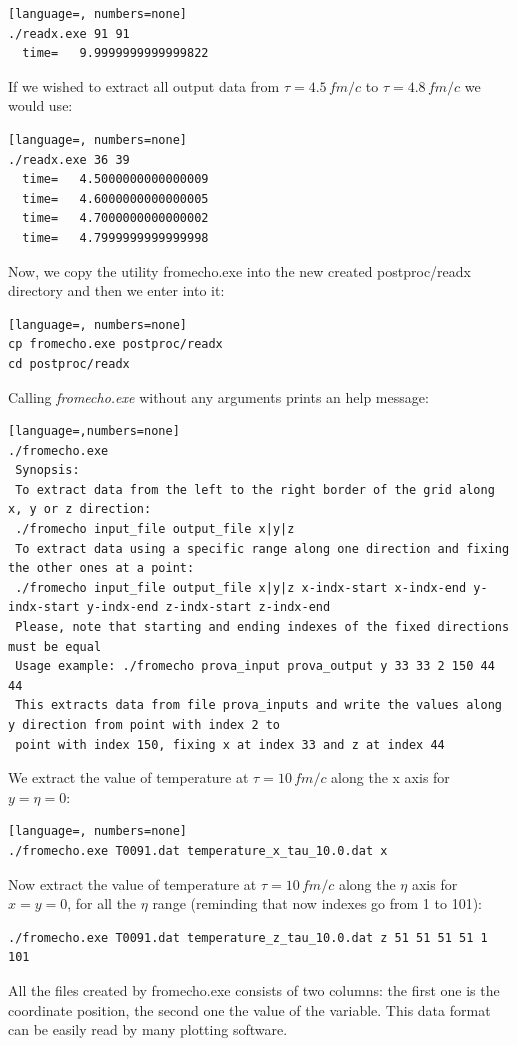 \begin{lstlisting}[language=, numbers=none]
./readx.exe 91 91
  time=   9.9999999999999822
\end{lstlisting}
If we wished to extract all output data from $\tau=4.5\,fm/c$ to $\tau=4.8\,fm/c$ we would use:\\
\begin{lstlisting}[language=, numbers=none]
./readx.exe 36 39
  time=   4.5000000000000009     
  time=   4.6000000000000005     
  time=   4.7000000000000002     
  time=   4.7999999999999998  
\end{lstlisting}
Now, we copy the utility fromecho.exe into the new created postproc/readx directory and then we enter into it:\\
\begin{lstlisting}[language=, numbers=none]
cp fromecho.exe postproc/readx
cd postproc/readx
\end{lstlisting}
Calling \emph{fromecho.exe} without any arguments prints an help message:
\begin{lstlisting}[language=,numbers=none]
./fromecho.exe 
 Synopsis:
 To extract data from the left to the right border of the grid along x, y or z direction:
 ./fromecho input_file output_file x|y|z
 To extract data using a specific range along one direction and fixing the other ones at a point:
 ./fromecho input_file output_file x|y|z x-indx-start x-indx-end y-indx-start y-indx-end z-indx-start z-indx-end
 Please, note that starting and ending indexes of the fixed directions must be equal
 Usage example: ./fromecho prova_input prova_output y 33 33 2 150 44 44
 This extracts data from file prova_inputs and write the values along y direction from point with index 2 to
 point with index 150, fixing x at index 33 and z at index 44
\end{lstlisting}
We extract the value of temperature at $\tau=10\,fm/c$ along the x axis for $y=\eta=0$:
\begin{lstlisting}[language=, numbers=none]
./fromecho.exe T0091.dat temperature_x_tau_10.0.dat x 
\end{lstlisting}
Now extract the value of temperature at $\tau=10\,fm/c$ along the $\eta$ axis for $x=y=0$, for all the $\eta$ range (reminding that now indexes go from 1 to 101):
\begin{lstlisting}[numbers=none]
./fromecho.exe T0091.dat temperature_z_tau_10.0.dat z 51 51 51 51 1 101
\end{lstlisting}
All the files created by fromecho.exe consists of two columns: the first one is the coordinate position, the second one the value of the variable. This data format can be easily read by many plotting software.\\
